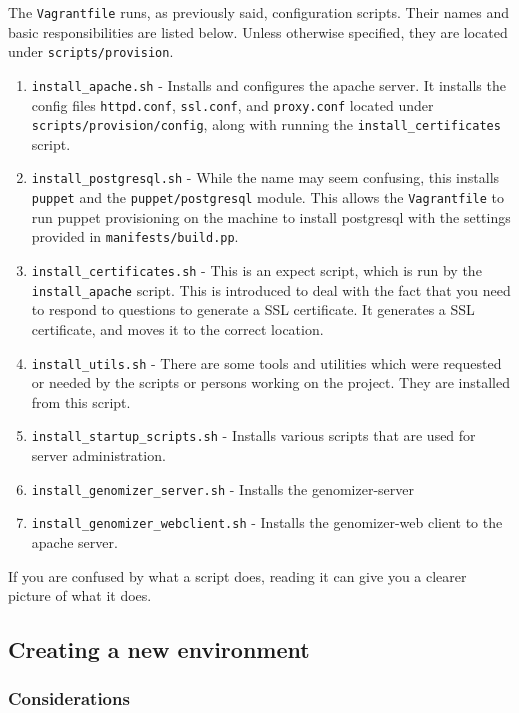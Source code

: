 The \texttt{Vagrantfile} runs, as previously said, configuration
scripts. Their names and basic responsibilities are listed below. Unless
otherwise specified, they are located under \texttt{scripts/provision}.

\begin{enumerate}
\itemsep1pt\parskip0pt
\item
  \texttt{install\_apache.sh} - Installs and configures the apache
  server. It installs the config files \texttt{httpd.conf},
  \texttt{ssl.conf}, and \texttt{proxy.conf} located under
  \texttt{scripts/provision/config}, along with running the
  \texttt{install\_certificates} script.
\item
  \texttt{install\_postgresql.sh} - While the name may seem confusing,
  this installs \texttt{puppet} and the \texttt{puppet/postgresql}
  module. This allows the \texttt{Vagrantfile} to run puppet
  provisioning on the machine to install postgresql with the settings
  provided in \texttt{manifests/build.pp}.
\item
  \texttt{install\_certificates.sh} - This is an expect script, which is
  run by the \texttt{install\_apache} script. This is introduced to deal
  with the fact that you need to respond to questions to generate a SSL
  certificate. It generates a SSL certificate, and moves it to the
  correct location.
\item
  \texttt{install\_utils.sh} - There are some tools and utilities which
  were requested or needed by the scripts or persons working on the
  project. They are installed from this script.
\item
  \texttt{install\_startup\_scripts.sh} - Installs various scripts that
  are used for server administration.
\item
  \texttt{install\_genomizer\_server.sh} - Installs the genomizer-server
\item
  \texttt{install\_genomizer\_webclient.sh} - Installs the genomizer-web
  client to the apache server.
\end{enumerate}

If you are confused by what a script does, reading it can give you a
clearer picture of what it does.

\subsection{Creating a new
environment}\label{sec:creating-a-new-environment}

\subsubsection{Considerations}\label{sec:considerations}

